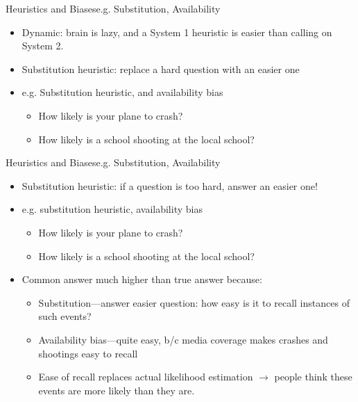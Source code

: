 \documentclass{beamer}
\begin{document}
\begin{frame}{Heuristics and Biases}{e.g. Substitution, Availability}
\begin{itemize}
\addtolength{\itemsep}{0.5\baselineskip}
\item Dynamic: brain is lazy, and a System 1 heuristic is easier than calling on System 2.
\item Substitution heuristic: replace a hard question with an easier one
\item e.g. Substitution heuristic, and availability bias
  \begin{itemize}
  \addtolength{\itemsep}{0.5\baselineskip}
  \item How likely is your plane to crash?
  \item How likely is a school shooting at the local school?
  \end{itemize}
\end{itemize}
\end{frame}

\begin{frame}{Heuristics and Biases}{e.g. Substitution, Availability}
\begin{itemize}
\addtolength{\itemsep}{0.5\baselineskip}
\item Substitution heuristic: if a question is too hard, answer an easier one!
\item e.g. substitution heuristic, availability bias
  \begin{itemize}
  \addtolength{\itemsep}{0.5\baselineskip}
  \item How likely is your plane to crash?
  \item How likely is a school shooting at the local school?
  \end{itemize}
\item Common answer much higher than true answer because:
  \begin{itemize}
  \addtolength{\itemsep}{0.5\baselineskip}
  \item Substitution---answer easier question: how easy is it to recall instances of such events?
  \item Availability bias---quite easy, b/c media coverage makes crashes and shootings easy to recall
  \item Ease of recall replaces actual likelihood estimation $\rightarrow$ people think these events are more likely than they are.
  \end{itemize}
\end{itemize}
\end{frame}
\end{document}
